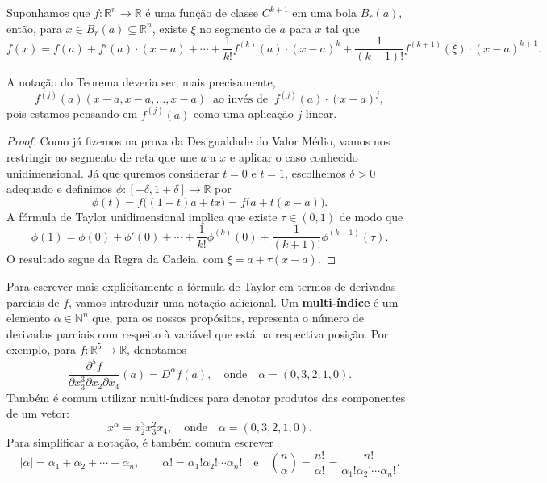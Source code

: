 \begin{teo}
	Suponhamos que $f: \mathbb{R}^n \to \mathbb{R}$ é uma função de classe $C^{k+1}$ em uma bola $B_r(a)$, então, para $x \in B_r(a) \subseteq \mathbb{R}^n$, existe $\xi$ no segmento de $a$ para $x$ tal que
	\begin{equation}\label{eqn:taylor}
	f(x) = f(a) + f'(a) \cdot (x-a) + \cdots + \frac{1}{k!} f^{(k)}(a) \cdot (x-a)^k + \frac{1}{(k+1)!} f^{(k+1)}(\xi) \cdot (x-a)^{k+1}.
	\end{equation}
\end{teo}

A notação do Teorema deveria ser, mais precisamente,
\[
f^{(j)}(a) (x-a, x-a, \dots, x-a) \ \text{ ao invés de } \ f^{(j)}(a) \cdot (x-a)^j,
\] pois estamos pensando em $f^{(j)}(a)$ como uma aplicação $j$-linear.

\begin{proof}
	Como já fizemos na prova da Desigualdade do Valor Médio, vamos nos restringir ao segmento de reta que une $a$ a $x$ e aplicar o caso conhecido unidimensional. Já que quremos considerar $t=0$ e $t=1$, escolhemos $\delta > 0$ adequado e definimos $\phi: [-\delta,1+\delta] \to \mathbb{R}$ por
	\[
	\phi(t) = f \big( (1-t)a + tx \big) = f \big( a + t(x-a) \big).
	\] A fórmula de Taylor unidimensional implica que existe $\tau \in (0,1)$ de modo que
	\begin{equation}\label{eqn:taylor-phi}
	\phi(1) = \phi(0) + \phi'(0) + \cdots + \frac{1}{k!} \phi^{(k)}(0) + \frac{1}{(k+1)!} \phi^{(k+1)}(\tau).
	\end{equation} O resultado segue da Regra da Cadeia, com $\xi =a + \tau(x-a)$.
\end{proof}


Para escrever mais explicitamente a fórmula de Taylor em termos de derivadas parciais de $f$, vamos introduzir uma notação adicional. Um \textbf{multi-índice} é um elemento $\alpha \in \mathbb{N}^n$ que, para os nossos propósitos, representa o número de derivadas parciais com respeito à variável que está na respectiva posição. Por exemplo, para $f:\mathbb{R}^5 \to \mathbb{R}$, denotamos 
\[
\frac{\partial^5 f}{\partial x_3^3 \partial x_2 \partial x_4} (a) = D^\alpha f (a), \quad \text{onde} \quad \alpha = (0, 3,2,1, 0).
\] Também é comum utilizar multi-índices para denotar produtos das componentes de um vetor:
\[
x^\alpha = x_2^3 x_3^2 x_4, \quad \text{onde} \quad \alpha = (0,3,2,1,0).
\] Para simplificar a notação, é também comum escrever
\[
|\alpha| = \alpha_1 + \alpha_2 + \cdots + \alpha_n, \qquad \alpha! = \alpha_1 ! \alpha_2 ! \cdots  \alpha_n! \quad \text{e} \quad 
\binom{n}{\alpha} = \frac{n!}{\alpha!} = \frac{n!}{\alpha_1 ! \alpha_2 ! \cdots  \alpha_n!}.
\]


